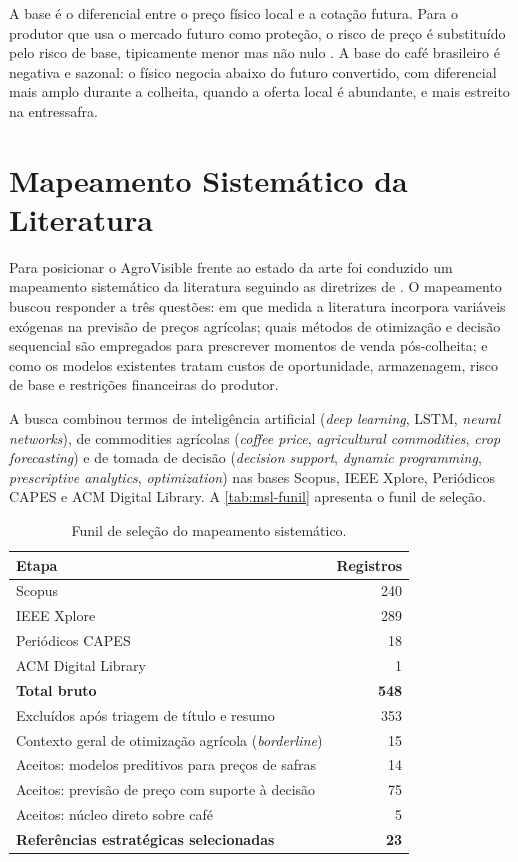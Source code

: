 A base é o diferencial entre o preço físico local e a cotação futura. Para o produtor que usa o mercado futuro como proteção, o risco de preço é substituído pelo risco de base, tipicamente menor mas não nulo \cite{Hull2018}. A base do café brasileiro é negativa e sazonal: o físico negocia abaixo do futuro convertido, com diferencial mais amplo durante a colheita, quando a oferta local é abundante, e mais estreito na entressafra.

\section{Mapeamento Sistemático da Literatura}\label{sec2:msl}

Para posicionar o AgroVisible frente ao estado da arte foi conduzido um mapeamento sistemático da literatura seguindo as diretrizes de . O mapeamento buscou responder a três questões: em que medida a literatura incorpora variáveis exógenas na previsão de preços agrícolas; quais métodos de otimização e decisão sequencial são empregados para prescrever momentos de venda pós-colheita; e como os modelos existentes tratam custos de oportunidade, armazenagem, risco de base e restrições financeiras do produtor.

A busca combinou termos de inteligência artificial (\textit{deep learning}, LSTM, \textit{neural networks}), de commodities agrícolas (\textit{coffee price}, \textit{agricultural commodities}, \textit{crop forecasting}) e de tomada de decisão (\textit{decision support}, \textit{dynamic programming}, \textit{prescriptive analytics}, \textit{optimization}) nas bases Scopus, IEEE Xplore, Periódicos CAPES e ACM Digital Library. A \autoref{tab:msl-funil} apresenta o funil de seleção.

\begin{table}[htb]
	\centering
	\caption{Funil de seleção do mapeamento sistemático.}\label{tab:msl-funil}
	\begin{tabular}{l r}
		\hline
		\textbf{Etapa} & \textbf{Registros} \\ \hline
		Scopus & 240 \\
		IEEE Xplore & 289 \\
		Periódicos CAPES & 18 \\
		ACM Digital Library & 1 \\
		\textbf{Total bruto} & \textbf{548} \\ \hline
		Excluídos após triagem de título e resumo & 353 \\
		Contexto geral de otimização agrícola (\textit{borderline}) & 15 \\
		Aceitos: modelos preditivos para preços de safras & 14 \\
		Aceitos: previsão de preço com suporte à decisão & 75 \\
		Aceitos: núcleo direto sobre café & 5 \\ \hline
		\textbf{Referências estratégicas selecionadas} & \textbf{23} \\ \hline
	\end{tabular}
\end{table}

